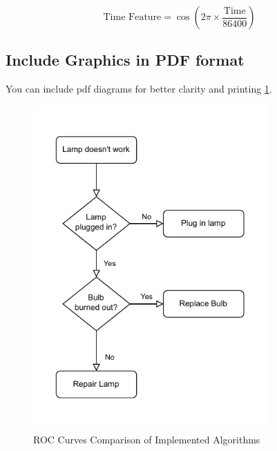 \begin{equation}
\text{Time Feature} = \cos\left(2\pi \times \frac{\text{Time}}{86400}\right)
\label{eq:einstein2}
\end{equation}




\subsection{Include Graphics in PDF format}

You can include pdf diagrams for better clarity and printing \ref{fig:roc_curves}.

\begin{figure}[h!]
\centering
\includegraphics[width=0.8\textwidth]{images/flow.pdf}
\caption{ROC Curves Comparison of Implemented Algorithms}
\label{fig:roc_curves}
\end{figure}

